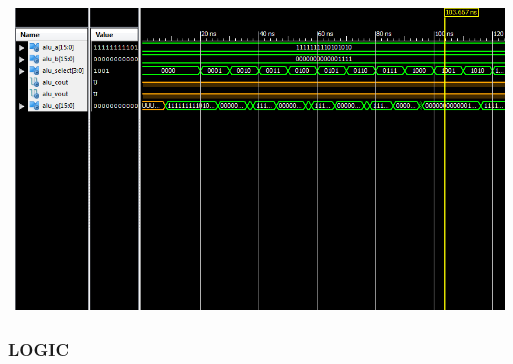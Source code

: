 \documentclass{article}
\begin{document}
\includegraphics[width=16cm, height=8cm]{test_alu.png}
\pagebreak


\subsubsection{LOGIC}\label{sec:result}
\end{document}
